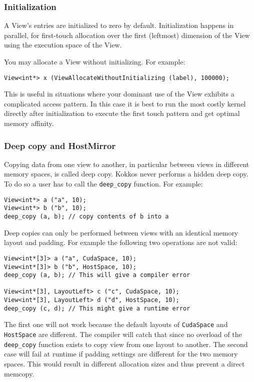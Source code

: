 \subsubsection{Initialization}

A View's entries are initialized to zero by default.  Initialization
happens in parallel, for first-touch allocation over the first
(leftmost) dimension of the View using the execution space
of the View. 

You may allocate a View without initializing.  For example:
\begin{lstlisting}
View<int*> x (ViewAllocateWithoutInitializing (label), 100000);
\end{lstlisting}
This is useful in situations where your dominant use of the View
exhibits a complicated access pattern. In this case it is best
to run the most costly kernel directly after initialization to 
execute the first touch pattern and get optimal memory affinity.

\subsubsection{Deep copy and HostMirror}

Copying data from one view to another, in particular between views 
in different memory spaces, is called deep copy. 
Kokkos never performs a hidden deep copy. To do so a user has to 
call the \lstinline!deep_copy! function.  For example:
\begin{lstlisting}
View<int*> a ("a", 10);
View<int*> b ("b", 10);
deep_copy (a, b); // copy contents of b into a
\end{lstlisting}

Deep copies can only be performed between views with an identical 
memory layout and padding. For example the following two operations
are not valid:
\begin{lstlisting}
View<int*[3]> a ("a", CudaSpace, 10);
View<int*[3]> b ("b", HostSpace, 10);
deep_copy (a, b); // This will give a compiler error

View<int*[3], LayoutLeft> c ("c", CudaSpace, 10);
View<int*[3], LayoutLeft> d ("d", HostSpace, 10);
deep_copy (c, d); // This might give a runtime error
\end{lstlisting}

The first one will not work because the default layouts of \lstinline|CudaSpace|
and \lstinline|HostSpace| are different. The compiler will catch that since 
no overload of the \lstinline|deep_copy| function exists to copy view from
one layout to another. The second case will fail at runtime if padding settings
are different for the two memory spaces. This would result in different 
allocation sizes and thus prevent a direct memcopy. 

